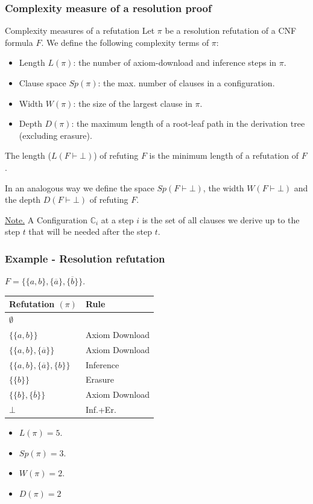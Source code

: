 \documentclass[t,usenames,dvipsnames]{beamer}
\begin{document}
\begin{frame}\frametitle{Complexity measure of a resolution proof}
	\begin{block}{Complexity measures of a refutation}
		Let $\pi$ be a resolution refutation of a CNF formula $F$. We define the
		following complexity terms of $\pi$:
		\begin{itemize}[<+->]
			\item Length $L(\pi)$: the number of axiom-download and
				inference steps in $\pi$.
			\item Clause space $Sp(\pi)$: the max. number of clauses in a
				configuration.
			\item Width $W(\pi)$: the size of the largest clause in $\pi$.
			\item Depth $D(\pi)$: the maximum length of a root-leaf path in the
				derivation tree (excluding erasure).
		\end{itemize}

		\pause%
		The length ($L(F \vdash \bot)$) of refuting $F$ is the minimum length of a
		refutation of $F$.
		
		\pause%
		In an analogous way we define the space $Sp(F \vdash \bot)$, the width $W(F
		\vdash \bot)$ and the depth $D(F \vdash \bot)$ of refuting $F$.
	\end{block}

	\pause
	\noindent \underline{Note.} A Configuration $\mathbb{C}_i$ at a step $i$ is the set of all
	clauses we derive up to the step $t$ that will be needed after the step $t$.
\end{frame}
\begin{frame}\frametitle{Example - Resolution refutation}
	$F = \{ \{a, b\}, \{\overline a\}, \{\overline b\}\}.$ \pause
	\begin{center}
	\begin{tabular}{p{}|p{}}
		Refutation  $(\pi)$ & Rule\\ 
		\midrule
		$\emptyset$ &\\
		$\{\{a, b\}\}$ & Axiom Download\\
		$\{\{a, b\}, \{\overline a\}\}$ & Axiom Download\\
		$\{\{a, b\}, \{\overline a\}, \{b\}\}$ & Inference\\
		$\{\{b\}\}$ & Erasure\\
		$\{\{b\}, \{\overline b\}\}$ & Axiom Download\\
		$\bot$& Inf.+Er.\\
	  \end{tabular}
	\end{center} \pause
	\begin{itemize}[<+->]
		\item $L(\pi) = 5$.
		\item $Sp(\pi) = 3$.
		\item $W(\pi) = 2$.
		\item $D(\pi) = 2$
	\end{itemize}
\end{frame}
\end{document}
